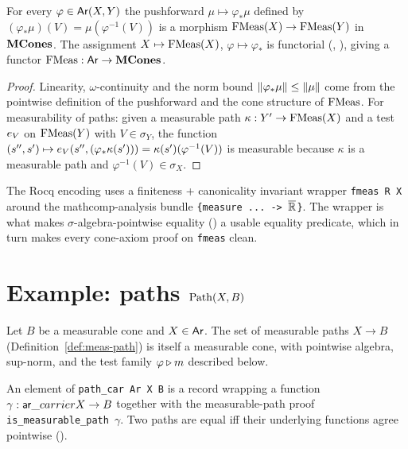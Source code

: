 \begin{lemma}%
  \label{lem:fmeas-push}
  \rocqok
  For every $\varphi \in \mathsf{Ar}(X, Y)$ the pushforward
  $\mu \mapsto \varphi_*\mu$ defined by
  $(\varphi_*\mu)(V) = \mu(\varphi^{-1}(V))$ is a morphism
  $\mathrm{FMeas}(X) \to \mathrm{FMeas}(Y)$ in $\mathbf{MCones}$. The assignment
  $X \mapsto \mathrm{FMeas}(X)$, $\varphi \mapsto \varphi_*$ is functorial
  (,
  ), giving a functor
  $\mathrm{FMeas} : \mathsf{Ar} \to \mathbf{MCones}$.
\end{lemma}
\begin{proof}
  Linearity, $\omega$-continuity and the norm bound
  $\lVert \varphi_*\mu \rVert \le \lVert \mu \rVert$ come from the pointwise
  definition of the pushforward and the cone structure of $\mathrm{FMeas}$.
  For measurability of paths: given a measurable path
  $\kappa : Y' \to \mathrm{FMeas}(X)$ and a test $e_{V}$ on $\mathrm{FMeas}(Y)$
  with $V \in \sigma_Y$, the function
  $(s'', s') \mapsto e_{V}(s'', (\varphi_* \kappa(s')))
   = \kappa(s')(\varphi^{-1}(V))$
  is measurable because $\kappa$ is a measurable path and
  $\varphi^{-1}(V) \in \sigma_X$.
\end{proof}

\begin{remark}
  The Rocq encoding uses a finiteness + canonicality invariant
  wrapper \texttt{fmeas R X} around the mathcomp-analysis bundle
  \texttt{\{measure ... -> \(\overline{\mathbb{R}}\)\}}. The wrapper is what
  makes $\sigma$-algebra-pointwise equality
  () a usable equality predicate,
  which in turn makes every cone-axiom proof on \texttt{fmeas} clean.
\end{remark}

\section{Example: paths
  \texorpdfstring{$\mathrm{Path}(X, B)$}{Path(X, B)}}\label{sec:path}

Let $B$ be a measurable cone and $X \in \mathsf{Ar}$. The set of measurable
paths $X \to B$ (Definition~\ref{def:meas-path}) is itself a measurable
cone, with pointwise algebra, sup-norm, and the test family $\varphi
\mathbin{\triangleright} m$ described below.

\begin{definition}%
  \label{def:path-carrier}
  \rocqok
  An element of \texttt{path\_car Ar X B} is a record wrapping a
  function $\gamma : \mathsf{ar}\_carrier X \to B$ together with the
  measurable-path proof
  \texttt{is\_measurable\_path \(\gamma\)}.
  Two paths are equal iff their underlying functions agree pointwise
  ().
\end{definition}

